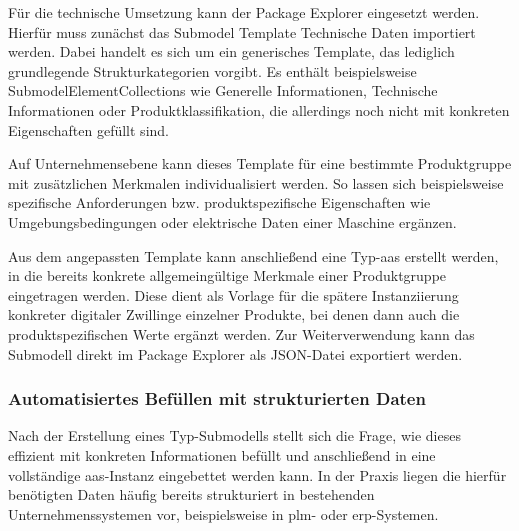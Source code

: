 Für die technische Umsetzung kann der Package Explorer eingesetzt werden.
Hierfür muss zunächst das Submodel Template Technische Daten importiert werden.
Dabei handelt es sich um ein generisches Template, das lediglich grundlegende Strukturkategorien vorgibt.
Es enthält beispielsweise SubmodelElementCollections wie Generelle Informationen, Technische Informationen oder Produktklassifikation, die allerdings noch nicht mit konkreten Eigenschaften gefüllt sind.

Auf Unternehmensebene kann dieses Template für eine bestimmte Produktgruppe mit zusätzlichen Merkmalen individualisiert werden.
So lassen sich beispielsweise spezifische Anforderungen bzw. produktspezifische Eigenschaften wie Umgebungsbedingungen oder elektrische Daten einer Maschine ergänzen.

Aus dem angepassten Template kann anschließend eine Typ-\acs{aas} erstellt werden, in die bereits konkrete allgemeingültige Merkmale einer Produktgruppe eingetragen werden.
Diese dient als Vorlage für die spätere Instanziierung konkreter digitaler Zwillinge einzelner Produkte, bei denen dann auch die produktspezifischen Werte ergänzt werden.
Zur Weiterverwendung kann das Submodell direkt im Package Explorer als JSON-Datei exportiert werden.





\subsubsection{Automatisiertes Befüllen mit strukturierten Daten}
Nach der Erstellung eines Typ-Submodells stellt sich die Frage, wie dieses effizient mit konkreten Informationen befüllt und anschließend in eine vollständige \acs{aas}-Instanz eingebettet werden kann.
In der Praxis liegen die hierfür benötigten Daten häufig bereits strukturiert in bestehenden Unternehmenssystemen vor, beispielsweise in \acs{plm}- oder \acs{erp}-Systemen.

